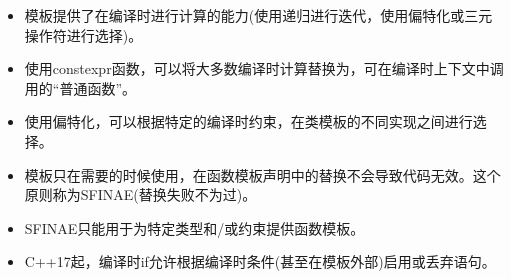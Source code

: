 
\begin{itemize}
\item 
模板提供了在编译时进行计算的能力(使用递归进行迭代，使用偏特化或三元操作符进行选择)。

\item 
使用constexpr函数，可以将大多数编译时计算替换为，可在编译时上下文中调用的“普通函数”。

\item 
使用偏特化，可以根据特定的编译时约束，在类模板的不同实现之间进行选择。

\item 
模板只在需要的时候使用，在函数模板声明中的替换不会导致代码无效。这个原则称为SFINAE(替换失败不为过)。

\item 
SFINAE只能用于为特定类型和/或约束提供函数模板。

\item 
C++17起，编译时if允许根据编译时条件(甚至在模板外部)启用或丢弃语句。
\end{itemize}